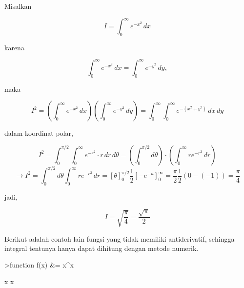 \documentclass[a4paper,11pt,oneside,enabledeprecatedfontcommands]{scrbook}
\newenvironment{eulernotebook}{}{}
\newenvironment{eulercomment}{\par\medskip\noindent}{\par\medskip}
\newenvironment{eulerformula}{}{}
\begin{document}
\begin{eulernotebook}
\begin{eulercomment}
Misalkan
\end{eulercomment}
\begin{eulerformula}
\[
I = \int_{0}^{\infty} e^{-x^2} \, dx
\]
\end{eulerformula}
\begin{eulercomment}
karena
\end{eulercomment}
\begin{eulerformula}
\[
\int_{0}^{\infty} e^{-x^2} \, dx = \int_{0}^{\infty} e^{-y^2} \, dy,
\]
\end{eulerformula}
\begin{eulercomment}
maka
\end{eulercomment}
\begin{eulerformula}
\[
I^2 = \left( \int_{0}^{\infty} e^{-x^2} \, dx \right) \left( \int_{0}^{\infty} e^{-y^2} \, dy \right) = \int_{0}^{\infty} \int_{0}^{\infty} e^{-(x^2 + y^2)} \, dx \, dy
\]
\end{eulerformula}
\begin{eulercomment}
dalam koordinat polar,
\end{eulercomment}
\begin{eulerformula}
\[
I^2 = \int_{0}^{\pi/2} \int_{0}^{\infty} e^{-r^2} \cdot r \, dr \, d\theta = \left( \int_{0}^{\pi/2} d\theta \right) \cdot \left( \int_{0}^{\infty} r e^{-r^2} \, dr \right)
\]
\end{eulerformula}
\begin{eulerformula}
\[
\rightarrow I^2= \int_{0}^{\pi/2} d\theta \int_{0}^{\infty} r e^{-r^2} \, dr = [\theta]_{0}^{\pi/2} \frac{1}{2} \left[ -e^{-u} \right]_{0}^{\infty} = \frac{\pi}{2} \frac{1}{2} (0 - (-1)) = \frac{\pi}{4}
\]
\end{eulerformula}
\begin{eulercomment}
jadi,
\end{eulercomment}
\begin{eulerformula}
\[
I = \sqrt{\frac{\pi}{4}} = \frac{\sqrt{\pi}}{2}
\]
\end{eulerformula}
\begin{eulercomment}
Berikut adalah contoh lain fungsi yang tidak memiliki antiderivatif, sehingga integral tentunya hanya dapat dihitung dengan metode numerik.
\end{eulercomment}
\begin{eulerprompt}
>function f(x) &= x^x
\end{eulerprompt}
\begin{euleroutput}
  
                                                     x
                                                    x
  

\end{euleroutput}
\end{eulernotebook}
\end{document}
